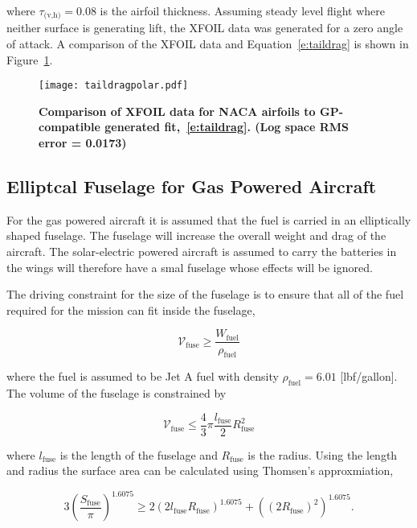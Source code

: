 \documentclass[]{aiaa-tc}%
\begin{document}
where $\tau_{\text{(v,h)}} = 0.08$ is the airfoil thickness. Assuming steady level flight where neither surface is generating lift, the XFOIL data was generated for a zero angle of attack. A comparison of the XFOIL data and Equation~\eqref{e:taildrag} is shown in Figure~\ref{f:taildragpolar}.

\begin{figure}[H]
	\begin{center}
	\texttt{[image: taildragpolar.pdf]}
    \caption{ \textbf{Comparison of XFOIL data for NACA airfoils to GP-compatible generated fit,~\eqref{e:taildrag}. (Log space RMS error = 0.0173)}}
	\label{f:taildragpolar}
	\end{center}
\end{figure}

\subsection{Elliptcal Fuselage for Gas Powered Aircraft}

For the gas powered aircraft it is assumed that the fuel is carried in an elliptically shaped fuselage.  The fuselage will increase the overall weight and drag of the aircraft.  The solar-electric powered aircraft is assumed to carry the batteries in the wings will therefore have a smal fuselage whose effects will be ignored.  

The driving constraint for the size of the fuselage is to ensure that all of the fuel required for the mission can fit inside the fuselage, 

\begin{equation}
    \label{e:fusevol}
    \mathcal{V}_{\text{fuse}} \geq \frac{W_\text{fuel}}{\rho_\text{fuel}}
\end{equation}

where the fuel is assumed to be Jet A fuel with density $\rho_\text{fuel} = 6.01$ [lbf/gallon].  The volume of the fuselage is constrained by

\begin{equation}
    \label{e:fusevol2}
    \mathcal{V}_{\text{fuse}} \leq \frac{4}{3}\pi \frac{l_{\text{fuse}}}{2}R_{\text{fuse}}^2
\end{equation}

where $l_{\text{fuse}}$ is the length of the fuselage and $R_{\text{fuse}}$ is the radius. Using the length and radius the surface area can be calculated using Thomsen's approxmiation,\cite{ellipsoidSA}

\begin{equation}
    \label{e:fusesa}
    3 \left( \frac{S_{\text{fuse}}}{\pi} \right)^{1.6075} \geq 2(2l_{\text{fuse}}R_{\text{fuse}})^{1.6075} + ((2R_{\text{fuse}})^2)^{1.6075}.
\end{equation}
\end{document}
